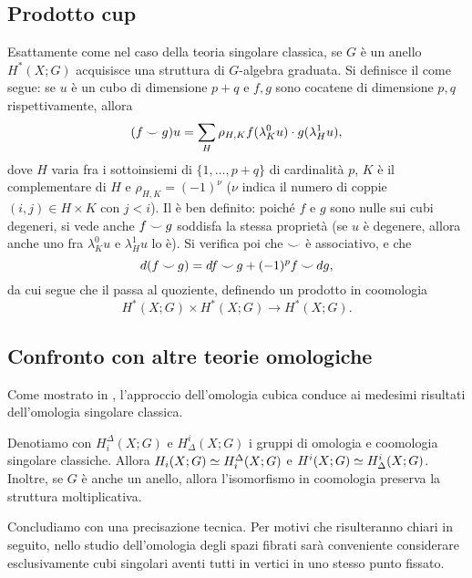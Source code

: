 \subsection{Prodotto cup}\label{cubic-homology:cup-product}
Esattamente come nel caso della teoria singolare classica, se $G$ è un anello $H^*(X;G)$ acquisisce una struttura di $G$-algebra graduata. Si definisce il \cupproduct{} come segue: se $u$ è un cubo di dimensione $p+q$ e $f,g$ sono cocatene di dimensione $p,q$ rispettivamente, allora
$$
(f\mathbin{\smile} g)u=\sum_H\rho_{H,K}f(\lambda^0_Ku)\cdot g(\lambda^1_Hu),
$$
dove $H$ varia fra i sottoinsiemi di $\{1,\ldots,p+q\}$ di cardinalità $p$, $K$ è il complementare di $H$ e $\rho_{H,K}=(-1)^\nu$ ($\nu$ indica il numero di coppie $(i,j)\in H\times K$ con $j<i$). Il \cupproduct{} è ben definito: poiché $f$ e $g$ sono nulle sui cubi degeneri, si vede anche $f\mathbin{\smile} g$ soddisfa la stessa proprietà (se $u$ è degenere, allora anche uno fra $\lambda^0_Ku$ e $\lambda^1_Hu$ lo è). Si verifica poi che $\mathbin{\smile}$ è associativo, e che
$$
d(f\mathbin{\smile} g)=df\mathbin{\smile} g+(-1)^pf\mathbin{\smile} dg,
$$
da cui segue che il \cupproduct{} passa al quoziente, definendo un prodotto in coomologia 
$$
H^*(X;G)\times H^*(X;G)\longrightarrow H^*(X;G).
$$

\subsection{Confronto con altre teorie omologiche}\label{cubic-homology:comparison}
Come mostrato in , l'approccio dell'omologia cubica conduce ai medesimi risultati dell'omologia singolare classica.

\begin{proposition}
Denotiamo con $H_i^\Delta(X;G)$ e $H^i_\Delta(X;G)$ i gruppi di omologia e coomologia singolare classiche. Allora $H_i(X;G)\simeq H_i^\Delta(X;G)$ e $H^i(X;G)\simeq H_\Delta^i(X;G)$. Inoltre, se $G$ è anche un anello, allora l'isomorfismo in coomologia preserva la struttura moltiplicativa.
\end{proposition}

Concludiamo con una precisazione tecnica. Per motivi che risulteranno chiari in seguito, nello studio dell'omologia degli spazi fibrati sarà conveniente considerare esclusivamente cubi singolari aventi tutti in vertici in uno stesso punto fissato.

